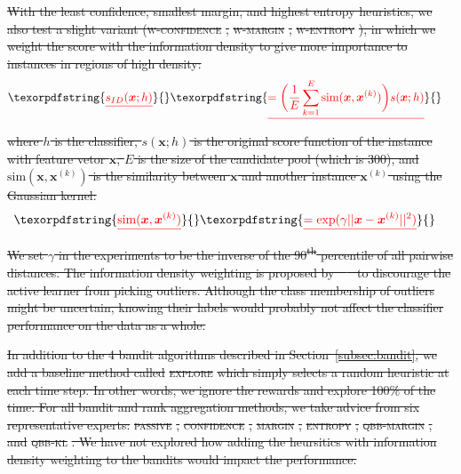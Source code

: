 \documentclass[fleqn,10pt,lineno]{wlpeerj} %
\providecommand{\DIFdeltex}[1]{{\protect\color{red}\sout{#1}}}                      %
\providecommand{\DIFdelbegin}{} %
\providecommand{\DIFdel}[1]{\texorpdfstring{\DIFdeltex{#1}}{}} %
\begin{document}
\DIFdelbegin \DIFdel{With the least confidence, smallest margin, and highest entropy
heuristics, we also test a slight variant (}\textsc{\DIFdel{w-confidence}}%
\DIFdel{,
}\textsc{\DIFdel{w-margin}}%
\DIFdel{, }\textsc{\DIFdel{w-entropy}}%
\DIFdel{), in which we weight the score with the
information density to give more importance to instances in regions of high
density:
}\begin{eqnarray*}
	\DIFdel{s_{ID}(\bm{x}; h) }&\DIFdel{=
		\bigg(\dfrac{1}{E} \sum_{k = 1}^E
		\text{sim}(\bm{x}, \bm{x}^{(k)})\bigg) s(\bm{x}; h)
}\end{eqnarray*}
\DIFdel{where $h$ is the classifier, $s(\bm{x}; h)$ is the original score function of
the instance with feature vetor $\bm{x}$, $E$ is the size of the candidate pool
(which is 300), and $\text{sim}(\bm{x}, \bm{x}^{(k)})$ is the similarity
between $\bm{x}$ and another instance $\bm{x}^{(k)}$ using the Gaussian kernel:
}\begin{eqnarray*}
	\DIFdel{\text{sim}(\bm{x}, \bm{x}^{(k)})
		}&\DIFdel{= \exp(\gamma ||\bm{x} - \bm{x}^{(k)}||^2)
}\end{eqnarray*}
\DIFdel{We set $\gamma$ in the experiments to be the inverse of the
90\textsuperscript{th} percentile of all pairwise distances. The information
density weighting is proposed by~\mbox{%
\cite{settles08} }\hspace{0pt}%
to discourage the active
learner from picking outliers. Although the class membership of outliers might
be uncertain, knowing their labels would probably not affect the classifier
performance on the data as a whole.
}%

\DIFdel{In addition to the 4 bandit algorithms described in
Section~\ref{subsec:bandit}, we add a baseline method called }\textsc{\DIFdel{explore}}
\DIFdel{which simply selects a random heuristic at each time step. In other words, we
ignore the rewards and explore 100\% of the time. For all bandit and rank
aggregation methods, we take advice from six representative experts:
}\textsc{\DIFdel{passive}}%
\DIFdel{, }\textsc{\DIFdel{confidence}}%
\DIFdel{, }\textsc{\DIFdel{margin}}%
\DIFdel{, }\textsc{\DIFdel{entropy}}%
\DIFdel{,
}\textsc{\DIFdel{qbb-margin}}%
\DIFdel{, and }\textsc{\DIFdel{qbb-kl}}%
\DIFdel{. We have not explored how adding the
heursitics with information density weighting to the bandits would impact
the performance.
}%
\end{document}
